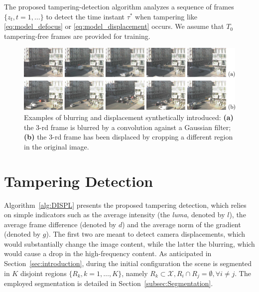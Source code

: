 \documentclass{llncs}
\begin{document}
The proposed tampering-detection algorithm analyzes a sequence of frames $\{z_t, t=1,\dots\}$ to detect the time instant $\tau^*$ when tampering like \eqref{eq:model_defocus} or \eqref{eq:model_displacement} occurs. We assume that $T_0$ tampering-free frames are provided for training.

\begin{figure}[t]
\centering
\includegraphics[width=1\linewidth]{Immagini/sequenze}
\caption{Examples of blurring and displacement synthetically introduced: \textbf{(a)} the 3-rd frame is blurred by a convolution against a Gaussian filter; \textbf{(b)} the 3-rd frame has been displaced by cropping a different region in the original image.}
\label{fig:sequences}
\end{figure}

\section{Tampering Detection}\label{sec:propSol}

Algorithm~\ref{alg:DISPL} presents the proposed tampering detection, which relies on simple indicators such as the average intensity (the \emph{luma}, denoted by $l$), the average frame difference (denoted by $d$) and the average norm of the gradient (denoted by $g$). The first two are meant to detect camera displacements, which would substantially change the image content, while the latter the blurring, which would cause a drop in the high-frequency content. As anticipated in Section~\ref{sec:introduction}, during the initial configuration the scene is segmented in $K$ disjoint regions $\{R_k, k = 1,\dots,K\}$, namely $R_k \subset \mathcal{X}, R_i \cap R_j = \emptyset, \forall i \neq j$. The employed segmentation is detailed in Section~\ref{subsec:Segmentation}. 
\end{document}
